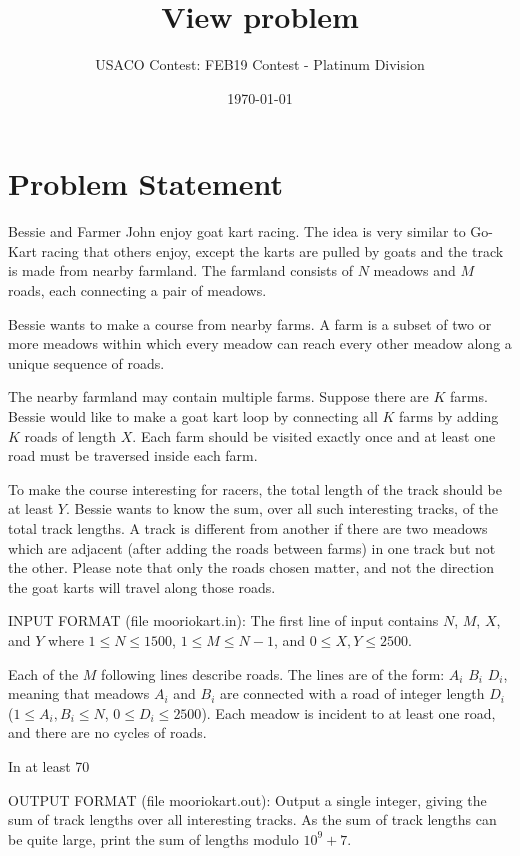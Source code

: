 \documentclass[12pt]{article}
\title{View problem}
\author{USACO Contest: FEB19 Contest - Platinum Division}
\date{\today}
\begin{document}
\maketitle

\section*{Problem Statement}

Bessie and Farmer John enjoy goat kart racing. The idea is very similar to
Go-Kart racing that others enjoy, except the karts are pulled by goats and the
track is made from nearby farmland. The farmland consists of $N$ meadows and $M$
roads, each connecting a pair of meadows.

Bessie wants to make a course from nearby farms.  A farm is a subset of two or
more meadows within which every meadow can reach every other meadow along a 
unique sequence of roads.  

The nearby farmland may contain multiple farms. Suppose there are $K$ farms.
Bessie would like to make a goat kart loop by connecting all $K$ farms by adding
$K$ roads of length $X$. Each farm should be visited exactly once and at least
one road must be traversed inside each farm.

To make the course interesting for racers, the total length of the track should
be at least $Y$. Bessie wants to know the sum, over all such interesting tracks,
of the total track lengths.  A track is different from another if there are two
meadows which are adjacent (after adding the roads between farms) in one track
but not the other. Please note that only the roads chosen matter, and not the
direction the goat karts will travel along those roads.

INPUT FORMAT (file mooriokart.in):
The first line of input contains $N$, $M$, $X$, and $Y$ where
$1 \leq N \leq 1500$, $1 \leq M \leq N-1$, and $0 \leq X, Y \leq 2500$.

Each of the $M$ following lines describe roads. The lines are of the form: $A_i$
$B_i$ $D_i$, meaning that meadows $A_i$ and $B_i$ are connected with a road of
integer length $D_i$ ($1 \leq A_i, B_i \leq N$, $0 \leq D_i \leq 2500$).  Each
meadow is incident to at least one road, and there are no cycles of roads.

In at least 70%

OUTPUT FORMAT (file mooriokart.out):
Output a single integer, giving the sum of track lengths over all interesting
tracks. As the sum of track lengths can be quite large, print the sum of lengths
modulo
$10^9+7$.
\end{document}
